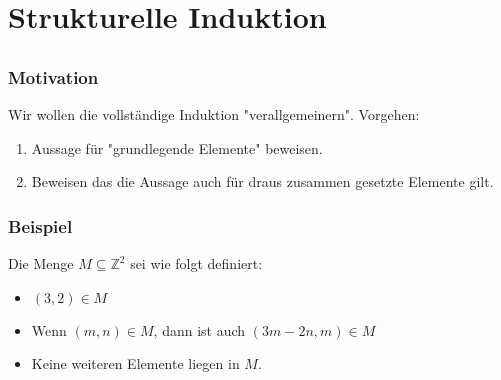 \section{Strukturelle Induktion}

\subsection*{}
\begin{frame}
  \frametitle{Motivation}
  Wir wollen die vollständige Induktion "verallgemeinern".
  Vorgehen:
  \begin{enumerate}
      \item Aussage für "grundlegende Elemente" beweisen.
      \item Beweisen das die Aussage auch für draus zusammen gesetzte Elemente gilt.
  \end{enumerate}
\end{frame}
\begin{frame}
  \frametitle{Beispiel}
  Die Menge $M \subseteq \mathbb{Z}^2$ sei wie folgt definiert:
  \begin{itemize}
      \item $(3, 2) \in M$
      \item Wenn $(m, n) \in M$, dann ist auch $(3m - 2n, m) \in M$
      \item Keine weiteren Elemente liegen in $M$.
  \end{itemize}
\end{frame}
